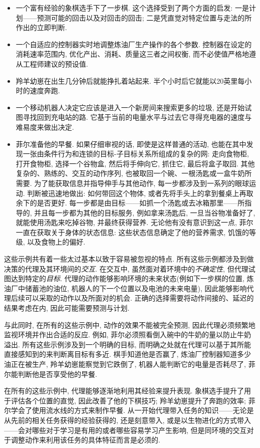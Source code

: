\begin{itemize}
\item 一个富有经验的象棋选手下了一步棋. 这个选择受到了两个方面的启发: 一是计划——预测可能的回击以及对回击的回击; 二是凭直觉对特定位置与走法的所作出的立即判断. 
\item 一个自适应的控制器实时地调整炼油厂生产操作的各个参数. 控制器在设定的消耗速率范围内, 优化产出、消耗、质量这三者之间权衡, 而不必使值严格地遵从工程师建议的预设值. 
\item 羚羊幼崽在出生几分钟后就能挣扎着站起来. 半个小时后它就能以20英里每小时的速度奔跑.
\item 一个移动机器人决定它应该是进入一个新房间来搜索更多的垃圾, 还是开始试图寻找回到充电站的路. 它基于当前的电量水平与过去它寻得充电器的速度与难易度来做出决定.
\item 菲尔准备他的早餐. 如果仔细审视的话, 即使是这样普通的活动, 也能在其中发现一张由条件行为和连锁的目标-子目标关系所组成的复杂的网: 走向食物柜, 打开食物柜, 选择一个谷物盒, 然后将手伸向它, 抓住它, 最后将盒子取回. 其他复杂的、熟练的、交互的动作序列, 也被取回一个碗、一根汤匙或一盒牛奶所需要. 为了能获取信息并指导伸手与其他动作, 每一步都涉及到一系列的眼球运动. 判断被迅速地做出: 如何带回这个物体, 或者先将手头上的拿到餐桌上再取余下的是否更好. 每一步都是由目标——如抓一个汤匙或去冰箱那里——所指导的, 并且每一步都为其他的目标服务, 例如拿来汤匙后, 一旦当谷物准备好了, 就能使用汤匙来吃掉谷物, 并最终获得营养. 无论他有没有意识到这一点, 菲尔一直在获取关于身体的状态信息: 这些状态信息确定了他的营养需求, 饥饿的等级, 以及食物上的偏好.
\end{itemize}

这些示例共有着一些太过基本以致于容易被忽视的特点. 所有这些示例都涉及到做决策的代理及其环境间的\emph{交互}. 在交互中, 虽然面对着环境中的\emph{不确定性}, 但代理试图达到特定的\emph{目标}. 代理的动作能够影响环境的未来状态(例如下一步棋的位置, 炼油厂中储蓄池的油位, 机器人的下一个位置以及电池的未来电量), 因此能够影响代理后续可以采取的动作以及所面对的机会. 正确的选择需要将动作间接的、延迟的结果考虑在内, 因此可能需要预测与计划.

与此同时, 在所有的这些示例中, 动作的效果不能被完全预测, 因此代理必须频繁地监视环境并作出合适的反应. 例如, 菲尔必须照看倒入碗中的牛奶的量以防止牛奶溢出. 所有这些示例涉及到一个明确的目标, 而明确之处就在代理可以基于其所能直接感知到的来判断离目标有多近. 棋手知道他是否赢了, 炼油厂控制器知道多少油正在被生产, 羚羊幼崽能察觉到它跌倒了, 机器人能判断它的电量是否耗尽了, 菲尔能判断他是否享受他的早餐.

在所有的这些示例中, 代理能够逐渐地利用其经验来提升表现. 象棋选手提升了用于评估各个位置的直觉, 因此改善了他的下棋技巧; 羚羊幼崽提升了奔跑的效率; 菲尔学会了使用流水线的方式来制作早餐. 从一开始代理带入任务的知识——无论是从先前的相关任务获得的经验获得的, 还是刻意带入, 或是以生物进化的方式带入——会对哪些对于学习是有用的或者哪些容易学习产生影响, 但是同环境的交互对于调整动作来利用该任务的具体特征而言是必须的. 

